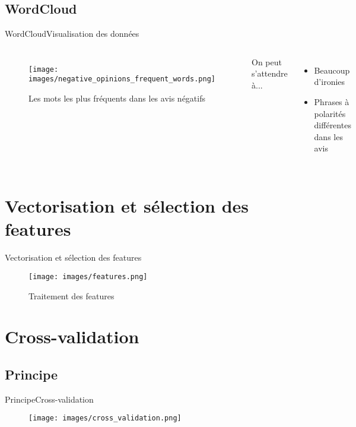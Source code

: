 \documentclass[usenames,dvipsnames]{beamer}
\begin{document}
\subsection{WordCloud}
\begin{frame}{WordCloud}{Visualisation des données}
\begin{columns}
\begin{figure}
    \centering
    \texttt{[image: images/negative\_opinions\_frequent\_words.png]}
    \caption{Les mots les plus fréquents dans les avis négatifs}
\end{figure}
On peut s'attendre à...
\begin{itemize}
    \item Beaucoup d'ironies
    \item Phrases à polarités différentes dans les avis
\end{itemize}
\end{columns}
\end{frame}

\section{Vectorisation et sélection des features}
\begin{frame}{Vectorisation et sélection des features}
\begin{figure}
    \centering
    \texttt{[image: images/features.png]}
    \caption{Traitement des features}
    \label{fig:features}
\end{figure}
\end{frame}

\section{Cross-validation}
\subsection{Principe}
\begin{frame}{Principe}{Cross-validation}
\begin{figure}[!ht]
  \centering
  \texttt{[image: images/cross\_validation.png]}
\end{figure}
\end{frame}
\end{document}
